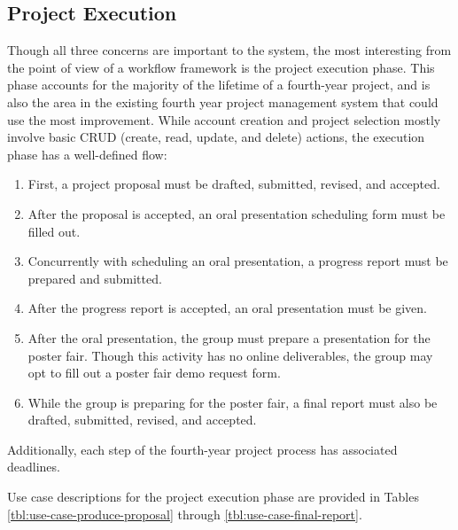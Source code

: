\documentclass[document.tex]{subfiles}
\begin{document}
\FloatBarrier

\subsection{Project Execution}
\label{sec:4ys-project-execution}

Though all three concerns are important to the system, the most interesting from the point of view of a workflow framework is the project execution phase. This phase accounts for the majority of the lifetime of a fourth-year project, and is also the area in the existing fourth year project management system that could use the most improvement. While account creation and project selection mostly involve basic CRUD (create, read, update, and delete) actions, the execution phase has a well-defined flow:
\begin{enumerate}
\item First, a project proposal must be drafted, submitted, revised, and accepted.
\item After the proposal is accepted, an oral presentation scheduling form must be filled out.
\item Concurrently with scheduling an oral presentation, a progress report must be prepared and submitted.
\item After the progress report is accepted, an oral presentation must be given.
\item After the oral presentation, the group must prepare a presentation for the poster fair. Though this activity has no online deliverables, the group may opt to fill out a poster fair demo request form.
\item While the group is preparing for the poster fair, a final report must also be drafted, submitted, revised, and accepted.
\end{enumerate}
Additionally, each step of the fourth-year project process has associated deadlines.

Use case descriptions for the project execution phase are provided in Tables \ref{tbl:use-case-produce-proposal} through \ref{tbl:use-case-final-report}.
\end{document}
